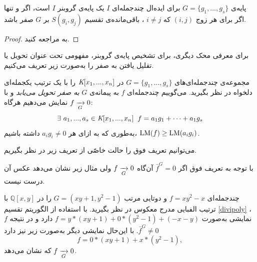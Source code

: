 \begin{theorem}
\label{buchberger criterion}
پایه‌ی 
$G = \{g_{1},...,g_{s}\}$
برای ایده‌ال چندجمله‌ای 
$I$
یک پایه‌ی گروبنر 
$I$
است، اگر و تنها اگر برای هر زوج 
$(i, j)$
که 
$i\neq j$
، 
باقی‌مانده‌ی تقسیم 
$S(g_{i}, g_{j})$
بر 
$G$
صفر باشد.
\end{theorem}
\begin{proof}
به 
\cite[ص، ۸۶]{IVAcox}
مراجعه کنید.
\end{proof}

برای معرفی محک دیگری، برای تشخیص پایه‌ی گروبنر، مفهومی تحت عنوان تحویل یا تقلیل یافتن به صفر را به‌صورت زیر تعریف می‌کنیم.
\begin{definition}
مجموعه‌ی چندجمله‌ای‌های 
$G = \{g_{1},...,g_{s}\}$
در 
$\textit{K}[x_{1},...,x_{n}]$
را با یک ترتیب یکجمله‌ای دلخواه در نظر بگیرید. می‌گوییم چندجمله‌ای 
$f$
به پیمانه‌ی 
$G$
\textit{به صفر تحویل می‌یابد}
و با 
$f\xrightarrow[G]{}0$
نمایش می‌دهیم هر‌گاه:
$$\exists \ a_{1},...,a_{s}\in\textit{K}[x_{1},...,x_{n}] \: \ f = a_{1}g_{1} + \cdots + a_{1}g_{s}$$
به‌طوری که به ازای هر 
$a_{i}g_{i}\neq 0$
 داشته باشیم، 
 $\operatorname{\mathrm{LM}}(f)\geq \operatorname{\mathrm{LM}}(a_{i}g_{i})$.
\end{definition}
می‌توانیم تعریف فوق را حالت خاصّی از تعریف زیر در نظر بگیریم.

با توجه به تعریف فوق اگر 
$\bar{f}^{G} = 0$
آن‌گاه 
$f\xrightarrow[G]{}0$
ولی مثال زیر نشان می‌دهد عکس آن درست نیست.
\begin{example}
چندجمله‌ای 
$f = xy^{2} - x$
و دوتایی مرتب 
$G = (xy + 1, y^{2} - 1)$
را در 
$\mathbb{Q}[x,y]$
با ترتیب الفبایی مدرج معکوس در نظر بگیرید. با استفاده از الگوریتم تقسیم 
\ref{divipoly}
، 
$f$
نمایشی به‌صورت 
$f = y*(xy + 1) + 0*(y^{2} - 1) + (-x - y)$
دارد و در نتیجه 
$\bar{f}^{G} \neq 0$.
با این‌حال نمایشی دیگر به‌صورت زیر نیز دارد
$$f = 0*(xy + 1) + x*(y^{2} - 1),$$
که نشان می‌دهد 
$f\xrightarrow[G]{}0$.
\end{example}

